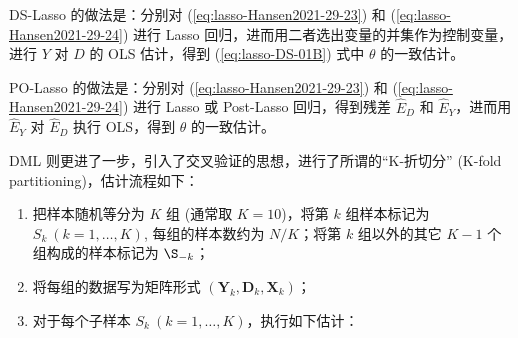 {DS-Lasso 的做法是：分别对 (\ref{eq:lasso-Hansen2021-29-23}) 和 (\ref{eq:lasso-Hansen2021-29-24}) 进行 Lasso 回归，进而用二者选出变量的并集作为控制变量，进行 $Y$ 对 $D$ 的 OLS 估计，得到 (\ref{eq:lasso-DS-01B}) 式中 $\theta$ 的一致估计。

PO-Lasso 的做法是：分别对 (\ref{eq:lasso-Hansen2021-29-23}) 和 (\ref{eq:lasso-Hansen2021-29-24}) 进行 Lasso 或 Post-Lasso 回归，得到残差 $\widehat{E}_D$ 和 $\widehat{E}_Y$，进而用 $\widehat{E}_Y$ 对 $\widehat{E}_D$ 执行 OLS，得到 $\theta$ 的一致估计。

DML 则更进了一步，引入了交叉验证的思想，进行了所谓的“K-折切分” (K-fold partitioning)，估计流程如下：
    
    \vspace{5pt}
    \begin{center}
    \end{center}
\begin{enumerate}
\item  把样本随机等分为 $K$ 组 (通常取 $K=10$)，将第 $k$ 组样本标记为 $S_{k}\ (k=1, \ldots, K)$, 每组的样本数约为 $N / K$；将第 $k$ 组以外的其它 $K-1$ 个组构成的样本标记为 $\S_{-k}$；
\item 将每组的数据写为矩阵形式 $\left(\boldsymbol{Y}_{k}, \boldsymbol{D}_{k}, \boldsymbol{X}_{k}\right)$；
\item 对于每个子样本 $S_{k}\ (k=1, \ldots, K)$，执行如下估计：

\end{enumerate}}
